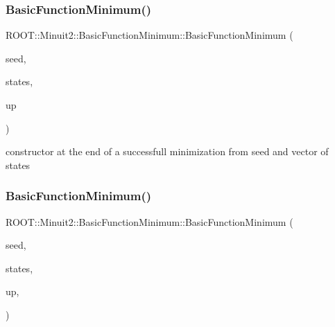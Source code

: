 \mbox{\label{classROOT_1_1Minuit2_1_1BasicFunctionMinimum_a8a2f91243b896e3fe682c19ccd57a9bc}} 
\subsubsection{\texorpdfstring{BasicFunctionMinimum()}{BasicFunctionMinimum()}\hspace{0.1cm}{\footnotesize\ttfamily [7/15]}}
{\footnotesize\ttfamily R\+O\+O\+T\+::\+Minuit2\+::\+Basic\+Function\+Minimum\+::\+Basic\+Function\+Minimum (\begin{DoxyParamCaption}\item[{const \mbox{\hyperlink{classROOT_1_1Minuit2_1_1MinimumSeed}{Minimum\+Seed}} \&}]{seed,  }\item[{const std\+::vector$<$ \mbox{\hyperlink{classROOT_1_1Minuit2_1_1MinimumState}{Minimum\+State}} $>$ \&}]{states,  }\item[{double}]{up }\end{DoxyParamCaption})\hspace{0.3cm}{\ttfamily [inline]}}



constructor at the end of a successfull minimization from seed and vector of states 

\mbox{\label{classROOT_1_1Minuit2_1_1BasicFunctionMinimum_a2a15d2336acfb9f3be41de8e477c191a}} 
\subsubsection{\texorpdfstring{BasicFunctionMinimum()}{BasicFunctionMinimum()}\hspace{0.1cm}{\footnotesize\ttfamily [8/15]}}
{\footnotesize\ttfamily R\+O\+O\+T\+::\+Minuit2\+::\+Basic\+Function\+Minimum\+::\+Basic\+Function\+Minimum (\begin{DoxyParamCaption}\item[{const \mbox{\hyperlink{classROOT_1_1Minuit2_1_1MinimumSeed}{Minimum\+Seed}} \&}]{seed,  }\item[{const std\+::vector$<$ \mbox{\hyperlink{classROOT_1_1Minuit2_1_1MinimumState}{Minimum\+State}} $>$ \&}]{states,  }\item[{double}]{up,  }\item[{\mbox{\hyperlink{classROOT_1_1Minuit2_1_1BasicFunctionMinimum_1_1MnReachedCallLimit}{Mn\+Reached\+Call\+Limit}}}]{ }\end{DoxyParamCaption})\hspace{0.3cm}{\ttfamily [inline]}}



